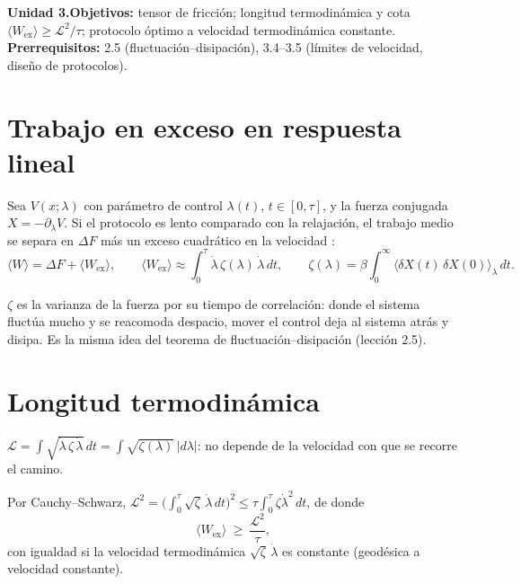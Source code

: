 \documentclass[11pt,a4paper]{article}
\begin{document}

\noindent\textbf{Unidad 3.}\quad\textbf{Objetivos:} tensor de fricción; longitud termodinámica y cota $\langle W_{\text{ex}}\rangle\ge\mathcal L^2/\tau$;
protocolo óptimo a velocidad termodinámica constante.
\textbf{Prerrequisitos:} 2.5 (fluctuación--disipación), 3.4--3.5 (límites de velocidad, diseño de protocolos).

\section{Trabajo en exceso en respuesta lineal}
Sea $V(x;\lambda)$ con parámetro de control $\lambda(t)$, $t\in[0,\tau]$, y la fuerza conjugada $X=-\partial_\lambda V$. Si el protocolo es lento
comparado con la relajación, el trabajo medio se separa en $\Delta F$ más un exceso cuadrático en la velocidad \cite{sivak}:
\begin{equation}
\langle W\rangle=\Delta F+\langle W_{\text{ex}}\rangle,\qquad
\langle W_{\text{ex}}\rangle\approx\int_0^\tau\dot\lambda\,\zeta(\lambda)\,\dot\lambda\,dt,\qquad
\zeta(\lambda)=\beta\int_0^\infty\langle\delta X(t)\,\delta X(0)\rangle_\lambda\,dt .
\end{equation}
\begin{intuicion}
$\zeta$ es la varianza de la fuerza por su tiempo de correlación: donde el sistema fluctúa mucho y se reacomoda despacio, mover el control
deja al sistema atrás y disipa. Es la misma idea del teorema de fluctuación--disipación (lección 2.5).
\end{intuicion}

\section{Longitud termodinámica}
\begin{definicion}
$\mathcal L=\int\sqrt{\dot\lambda\,\zeta\,\dot\lambda}\,dt=\int\sqrt{\zeta(\lambda)}\,|d\lambda|$: no depende de la velocidad con que se recorre el camino.
\end{definicion}
\begin{resultado}
Por Cauchy--Schwarz, $\mathcal L^2=\big(\int_0^\tau\sqrt\zeta\,\dot\lambda\,dt\big)^2\le\tau\int_0^\tau\zeta\dot\lambda^2\,dt$, de donde
\begin{equation}
\langle W_{\text{ex}}\rangle\ \ge\ \frac{\mathcal L^2}{\tau},
\end{equation}
con igualdad si la velocidad termodinámica $\sqrt\zeta\,\dot\lambda$ es constante (geodésica a velocidad constante).
\end{resultado}
\end{document}
